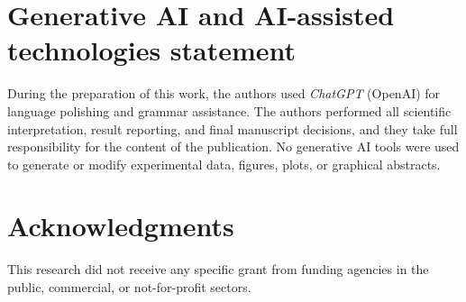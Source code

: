 ﻿\documentclass[review,1p,times]{elsarticle}
\begin{document}
\section*{Generative AI and AI-assisted technologies statement}
During the preparation of this work, the authors used \textit{ChatGPT} (OpenAI) for language polishing and grammar assistance. The authors performed all scientific interpretation, result reporting, and final manuscript decisions, and they take full responsibility for the content of the publication. No generative AI tools were used to generate or modify experimental data, figures, plots, or graphical abstracts.

\section*{Acknowledgments}
This research did not receive any specific grant from funding agencies in the public, commercial, or not-for-profit sectors.


\end{document}

